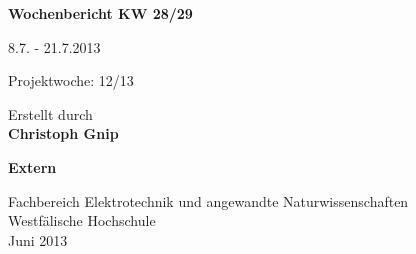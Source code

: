 
\begin{center}
{\Huge \textbf{Wochenbericht KW 28/29}\par}
\vspace{1cm}
{\Huge 8.7. - 21.7.2013\par}
\vspace{1cm}
{\Huge Projektwoche: 12/13\par}

\vspace{2cm}

\large{Erstellt durch}\\
\Large{\textbf{Christoph Gnip}}

\vspace{4cm}

\Large{\textbf{Extern}}

\vfill

{\normalsize Fachbereich Elektrotechnik und angewandte Naturwissenschaften\\
Westfälische Hochschule\\[2ex]Juni 2013}

\end{center}
\newpage